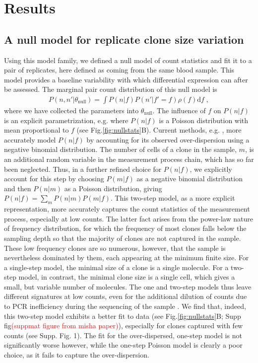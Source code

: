 \documentclass[letterpaper,english,prl,reprint,longbibliography]{revtex4-1} %
\begin{document}
\section*{Results}
\subsection*{A null model for replicate clone size variation}
Using this model family, we defined a null model of count statistics and fit it to a pair of replicates, here defined as coming from the same blood sample. 
This model provides a baseline variability with which differential expression can after be assessed. 
The marginal pair count distribution of this null model is  
\begin{eqnarray}
	P(n,n'|\theta_{\textrm{null}})=\int P(n|f)P(n'|f'=f)\rho(f)\text{d}f\;,
\end{eqnarray}
where we have collected the parameters into $\theta_{\textrm{null}}$. 
The influence of $f$ on $P(n|f)$ is an explicit parametrization, e.g. where $P(n|f)$ is a Poisson distribution with mean proportional to $f$ (see Fig.\ref{fig:nullstats}B). 
Current methods, e.g. \cite{Robinson2008}, more accurately model $P(n|f)$ by accounting for its observed over-dispersion using a negative binomial distribution. 
The number of cells of a clone in the sample, $m$, is an additional random variable in the measurement process chain, which has so far been neglected. 
Thus, in a further refined choice for $P(n|f)$, we explicitly account for this step by choosing $P(m|f)$ as a negative binomial distribution and then $P(n|m)$ as a Poisson distribution, giving $P(n|f)=\sum_m P(n|m)P(m|f)$. 
This two-step model, as a more explicit representation, more accurately captures the count statistics of the measurement process, especially at low counts. 
The latter fact arises from the power-law nature of frequency distribution, for which the frequency of most clones falls below the sampling depth so that the majority of clones are not captured in the sample. 
These low frequency clones are so numerous, however, that the sample is nevertheless dominated by them, each appearing at the minimum finite size. 
For a single-step model, the minimal size of a clone is a single molecule. 
For a two-step model, in contrast, the minimal clone size is a single cell, which gives a small, but variable number of molecules. 
The one and two-step models thus leave different signatures at low counts, even for the additional dilution of counts due to PCR inefficiency during the sequencing of the sample \citep{Best2015a}.
We find that, indeed, this two-step model exhibits a better fit to data (see Fig.\ref{fig:nullstats}B; Supp fig\textcolor{red}{(suppmat figure from misha paper)}), especially for clones captured with few counts (see Supp. Fig. 1). 
The fit for the over-dispersed, one-step model is not significantly worse however, while the one-step Poisson model is clearly a poor choice, as it fails to capture the over-dispersion.
\end{document}
